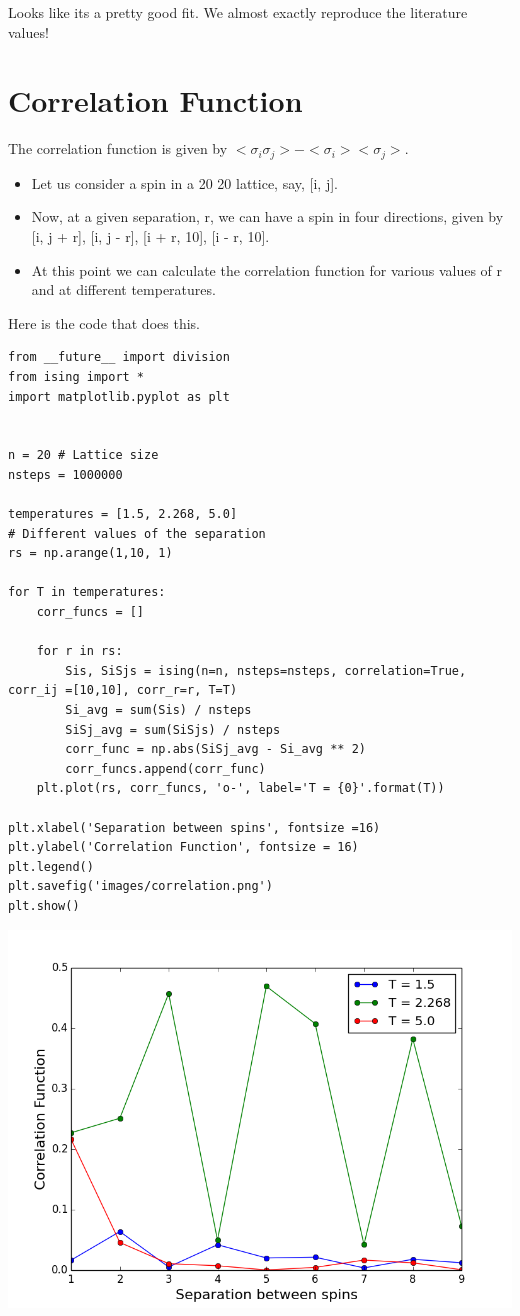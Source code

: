 \documentclass{article}
\begin{document}
Looks like its a pretty good fit. We almost exactly reproduce the literature values!


\section{Correlation Function}
\label{sec-7}

The correlation function is given by \(<\sigma_{i} \sigma_{j}> - <\sigma_{i}><\sigma_{j}>\). 

\begin{itemize}
\item Let us consider a spin in a 20 \texttimes{} 20 lattice, say, [i, j].

\item Now, at a given separation, r, we can have a spin in four directions, given by [i, j + r], [i, j - r], [i + r, 10], [i - r, 10].

\item At this point we can calculate the correlation function for various values of r and at different temperatures.
\end{itemize}

Here is the code that does this.

\begin{verbatim}
from __future__ import division
from ising import *
import matplotlib.pyplot as plt


n = 20 # Lattice size
nsteps = 1000000 

temperatures = [1.5, 2.268, 5.0]
# Different values of the separation
rs = np.arange(1,10, 1)

for T in temperatures:
    corr_funcs = []

    for r in rs:
        Sis, SiSjs = ising(n=n, nsteps=nsteps, correlation=True, corr_ij =[10,10], corr_r=r, T=T)
        Si_avg = sum(Sis) / nsteps
        SiSj_avg = sum(SiSjs) / nsteps
        corr_func = np.abs(SiSj_avg - Si_avg ** 2)
        corr_funcs.append(corr_func)
    plt.plot(rs, corr_funcs, 'o-', label='T = {0}'.format(T))

plt.xlabel('Separation between spins', fontsize =16)
plt.ylabel('Correlation Function', fontsize = 16)
plt.legend()
plt.savefig('images/correlation.png')
plt.show()
\end{verbatim}

\includegraphics[width=.9\linewidth]{./images/correlation.png}
\end{document}
